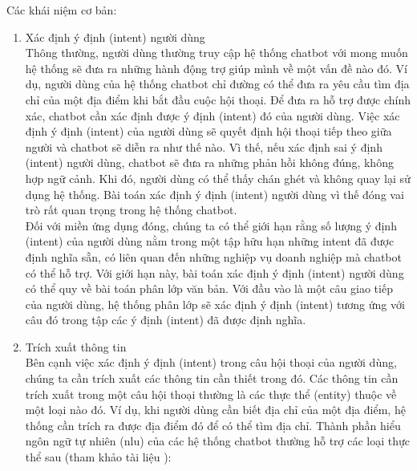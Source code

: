 Các khái niệm cơ bản:
\begin{enumerate}
    \item Xác định ý định (intent) người dùng
          \\
          Thông thường, người dùng thường truy cập hệ thống chatbot với mong muốn hệ thống sẽ đưa ra những hành động trợ giúp mình về một vấn đề nào đó. Ví dụ, người dùng của hệ thống chatbot chỉ đường có thể đưa ra yêu cầu tìm địa chỉ của một địa điểm khi bắt đầu cuộc hội thoại. Để đưa ra hỗ trợ được chính xác, chatbot cần xác định được ý định (intent) đó của người dùng. Việc xác định ý định (intent) của người dùng sẽ quyết định hội thoại tiếp theo giữa người và chatbot sẽ diễn ra như thế nào. Vì thế, nếu xác định sai ý định (intent) người dùng, chatbot sẽ đưa ra những phản hồi không đúng, không hợp ngữ cảnh. Khi đó, người dùng có thể thấy chán ghét và không quay lại sử dụng hệ thống. Bài toán xác định ý định (intent) người dùng vì thế đóng vai trò rất quan trọng trong hệ thống chatbot.
          \\
          Đối với miền ứng dụng đóng, chúng ta có thể giới hạn rằng số lượng ý định (intent) của người dùng nằm trong một tập hữu hạn những intent đã được định nghĩa sẵn, có liên quan đến những nghiệp vụ doanh nghiệp mà chatbot có thể hỗ trợ. Với giới hạn này, bài toán xác định ý định (intent) người dùng có thể quy về bài toán phân lớp văn bản. Với đầu vào là một câu giao tiếp của người dùng, hệ thống phân lớp sẽ xác định ý định (intent) tương ứng với câu đó trong tập các ý định (intent) đã được định nghĩa.
	    \item Trích xuất thông tin
          \\
          Bên cạnh việc xác định ý định (intent) trong câu hội thoại của người dùng, chúng ta cần trích xuất các thông tin cần thiết trong đó. Các thông tin cần trích xuất trong một câu hội thoại thường là các thực thể (entity) thuộc về một loại nào đó. Ví dụ, khi người dùng cần biết địa chỉ của một địa điểm, hệ thống cần trích ra được địa điểm đó để có thể tìm địa chỉ. Thành phần hiểu ngôn ngữ tự nhiên (\ac{nlu}) của các hệ thống chatbot thường hỗ trợ các loại thực thể sau (tham khảo tài liệu \cite{1}):


\end{enumerate}
